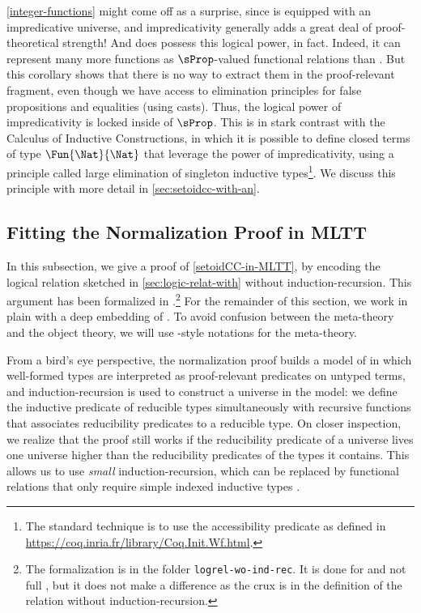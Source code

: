 %
\cref{integer-functions} might come off as a surprise, since \SetoidCC is equipped with an impredicative universe,
and impredicativity generally adds a great deal of proof-theoretical
strength!
%
And \SetoidCC does possess this logical power, in fact. Indeed, it can
represent many more functions as \( \sProp \)-valued functional relations
than \MLTT. But this corollary shows that there is no way to extract them
in the proof-relevant fragment, even though we have access to elimination
principles for false propositions and equalities (using casts).
%
Thus, the logical power of impredicativity is locked inside of \( \sProp \).
%
This is in stark contrast with the Calculus of Inductive Constructions,
in which it is possible to define closed terms of type \( \Fun{\Nat}{\Nat} \) that leverage
the power of impredicativity, using a principle called large elimination
of singleton inductive types\footnote{The standard technique is to use
the accessibility predicate as defined in \url{https://coq.inria.fr/library/Coq.Init.Wf.html}.}.
%
We discuss this principle with more detail in \cref{sec:setoidcc-with-an}.

\subsection{Fitting the Normalization Proof in MLTT}
\label{sec:fitt-norm-proof}

In this subsection, we give a proof of \cref{setoidCC-in-MLTT}, by
encoding the logical relation sketched in \cref{sec:logic-relat-with}
without induction-recursion.
%
This argument has been formalized in \Agda.\footnote{The formalization is in the
  folder \texttt{logrel-wo-ind-rec}. It is done for \MLTT and not
full \SetoidCC, but it does not make a difference as the crux is in
the definition of the relation without induction-recursion.}
%
For the remainder of this section, we work in plain \MLTT with a deep
embedding of \SetoidCC.
%
To avoid confusion between the meta-theory and the object theory, we
will use \Agda-style notations for the meta-theory.

From a bird's eye perspective, the normalization proof builds a model
of \SetoidCC in which well-formed types are interpreted as proof-relevant
predicates on untyped terms, and induction-recursion is used to construct a
universe in the model: we define the inductive predicate of reducible types
simultaneously with recursive functions that associates reducibility
predicates to a reducible type.
%
On closer inspection, we realize that the proof still works if the
reducibility predicate of a universe lives one universe higher than the
reducibility predicates of the types it contains. This allows us to use
\emph{small} induction-recursion, which can be replaced by functional
relations that only require simple indexed inductive types
.


